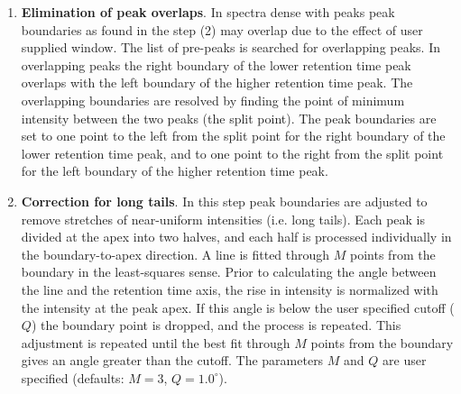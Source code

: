 \begin{enumerate}
\item {\bf Elimination of peak overlaps}. In spectra dense with
peaks peak boundaries as found in the step (2) may overlap due to
the effect of user supplied window. The list of pre-peaks is
searched for overlapping peaks. In overlapping peaks the right
boundary of the lower retention time peak overlaps with the
left boundary of the higher retention time peak. The overlapping
boundaries are resolved by finding the point of minimum intensity
between the two peaks (the split point). The peak boundaries are
set to one point to the left from the split point for the right
boundary of the lower retention time peak, and to one point to
the right from the split point for the left boundary of the
higher retention time peak.

\item {\bf Correction for long tails}.  In this step peak boundaries
are adjusted to remove stretches of near-uniform intensities
(i.e. long tails). Each peak is divided at the apex into two
halves, and each half is processed individually in the
boundary-to-apex direction. A line is fitted through $M$ points
from the boundary in the least-squares sense. Prior to calculating
the angle between the line and the retention time axis, the
rise in intensity is normalized with the intensity at the peak
apex.  If this angle is below the user specified cutoff ($Q$)
the boundary point is dropped, and the process is repeated.
This adjustment is repeated until the best fit through $M$ points
from the boundary gives an angle greater than the cutoff. The
parameters $M$ and $Q$ are user specified (defaults: $M = 3$,
$Q = 1.0^\circ$).

\end{enumerate}

